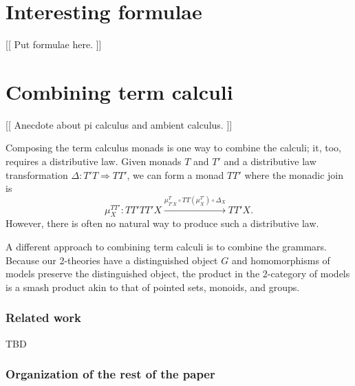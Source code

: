 \documentclass[]{acm_proc_article-sp}
\numberwithin{equation}{subsection}
\newcommand{\pic}{$\pi$-calculus}
\begin{document}
\section{Interesting formulae}

\begin{comment}
  * Examples of interesting formulae

      * primes in a monoid

      * deadlock-free (both kinds)

      * datalock-free? http://erights.org/elang/concurrency/epimenides.html

      * deniability from paper with Drossopolou

      * more?  
\end{comment}

[[ Put formulae here. ]]

\section{Combining term calculi}

[[ Anecdote about pi calculus and ambient calculus. ]]

Composing the term calculus monads is one way to combine the calculi; it, too, requires a distributive law.  Given monads $T$ and $T'$ and a distributive law transformation $\Delta\colon T'T \Rightarrow TT'$, we can form a monad $TT'$ where the monadic join is
\[ \mu^{TT'}_X\colon TT'TT'X \xrightarrow{\mu^T_{T'X} \circ TT(\mu^{T'}_X) \circ \Delta_X} TT'X. \]
However, there is often no natural way to produce such a distributive law.

A different approach to combining term calculi is to combine the grammars.  Because our 2-theories have a distinguished object $G$ and homomorphisms of models preserve the distinguished object, the product in the 2-category of models is a smash product akin to that of pointed sets, monoids, and groups.

\subsubsection{Related work}


TBD

\subsubsection{Organization of the rest of the paper}
\end{document}

